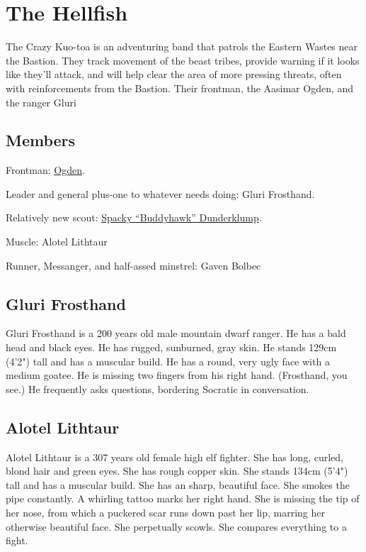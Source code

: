 \section{The Hellfish}

The Crazy Kuo-toa is an adventuring band that patrols the Eastern Wastes near the Bastion.
They track movement of the beast tribes, provide warning if it looks like they'll attack, and will
  help clear the area of more pressing threats, often with reinforcements from the Bastion.
Their frontman, the Aasimar Ogden, and the ranger Gluri
\subsection{Members}

Frontman:
\hyperref[subsec:ogden]{Ogden}.

Leader and general plus-one to whatever needs doing: Gluri Frosthand.

Relatively new scout:
\hyperref[subsec:buddyhawks]{Spacky ``Buddyhawk'' Dunderklump}.

Muscle:
Alotel Lithtaur

Runner, Messanger, and half-assed minstrel:
Gaven Bolbec

\subsection{Gluri Frosthand}

Gluri Frosthand is a 200 years old male mountain dwarf ranger.
He has a bald head and black eyes.
He has rugged, sunburned, gray skin.
He stands 129cm (4'2") tall and has a muscular build.
He has a round, very ugly face with a medium goatee.
He is missing two fingers from his right hand.
(Frosthand, you see.)
He frequently asks questions, bordering Socratic in conversation.

\subsection{Alotel Lithtaur}
Alotel Lithtaur is a 307 years old female high elf fighter.
She has long, curled, blond hair and green eyes.
She has rough copper skin.
She stands 134cm (5'4") tall and has a muscular build.
She has an sharp, beautiful face.
She smokes the pipe constantly.
A whirling tattoo marks her right hand.
She is missing the tip of her nose, from which a puckered scar runs down past her lip,
  marring her otherwise beautiful face.
She perpetually scowls.
She compares everything to a fight.

